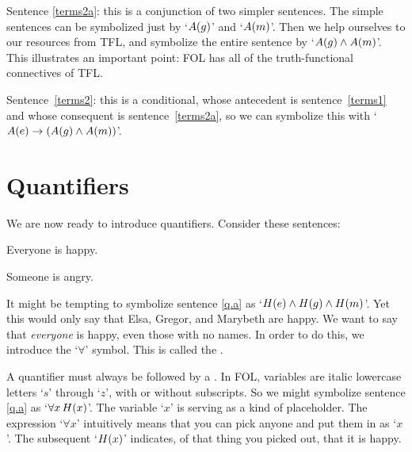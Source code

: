 Sentence \ref{terms2a}: this is a conjunction of two simpler sentences. The simple sentences can be symbolized just by `$\mathord{A}(g)$' and `$\mathord{A}(m)$'. Then we help ourselves to our resources from TFL, and symbolize the entire sentence by `$\mathord{A}(g) \wedge \mathord{A}(m)$'. This illustrates an important point: FOL has all of the truth-functional connectives of TFL.

Sentence~\ref{terms2}: this is a conditional, whose antecedent is sentence~\ref{terms1} and whose consequent is sentence~\ref{terms2a}, so we can symbolize this with `$\mathord{A}(e) \rightarrow (\mathord{A}(g) \wedge \mathord{A}(m))$'.

\section{Quantifiers}
We are now ready to introduce quantifiers. Consider these sentences:
	\begin{earg}
		\item[\ex{q.a}] Everyone is happy.
		\item[\ex{q.e}] Someone is angry.
	\end{earg}
It might be tempting to symbolize sentence \ref{q.a} as `$\mathord{H}(e) \wedge \mathord{H}(g) \wedge \mathord{H}(m)$'. Yet this would only say that Elsa, Gregor, and Marybeth are happy. We want to say that \emph{everyone} is happy, even those with no names. In order to do this, we introduce the `$\forall$' symbol. This is called the .


A quantifier must always be followed by a . In FOL, variables are italic lowercase letters `$s$' through `$z$', with or without subscripts. So we might symbolize sentence \ref{q.a} as `$\forall x\, \mathord{H}(x)$'.  The variable `$x$' is serving as a kind of placeholder. The expression `$\forall x$' intuitively means that you can pick anyone and put them in as `$x$'. The subsequent `$\mathord{H}(x)$' indicates, of that thing you picked out, that it is happy. 



